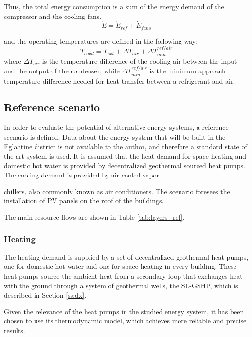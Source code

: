 \documentclass{article}
\begin{document}
Thus, the total energy consumption is a sum of the energy demand of the compressor and the cooling fans.
\begin{equation}
\dot{E} = \dot{E}_{ref} + \dot{E}_{fans}
\end{equation}

and the operating temperatures are defined in the following way:
\begin{equation}
T_{cond} = T_{ext} + \Delta T_{air} + \Delta T_{min}^{ref/air}
\end{equation}
where $\Delta T_{air}$ is the temperature difference of the cooling air between the input and the output of the condenser, while $\Delta T_{min}^{ref/air}$ is the minimum approach temperature difference needed for heat transfer between a refrigerant and air.\\


\subsection{Reference scenario}
In order to evaluate the potential of alternative energy systems, a reference scenario is defined. Data about the energy system that will be built in the Eglantine district is not available to the author, and therefore a standard state of the art system is used. It is assumed that the heat demand for space heating and domestic hot water is provided by decentralized geothermal sourced heat pumps. The cooling demand is provided by air cooled vapor 

 chillers, also commonly known as air conditioners. The scenario foresees the installation of PV panels on the roof of the buildings.


The main resource flows are shown in Table \ref{tab:layers_ref}.


\subsubsection{Heating}
The heating demand is supplied by a set of decentralized geothermal heat pumps, one for domestic hot water and one for space heating in every building. These heat pumps source the ambient heat from a secondary loop that exchanges heat with the ground through a system of geothermal wells, the SL-GSHP, which is described in Section \ref{ss:dx}. 

Given the relevance of the heat pumps in the studied energy system, it has been chosen to use its thermodynamic model, which achieves more reliable and precise results.\\
\end{document}
